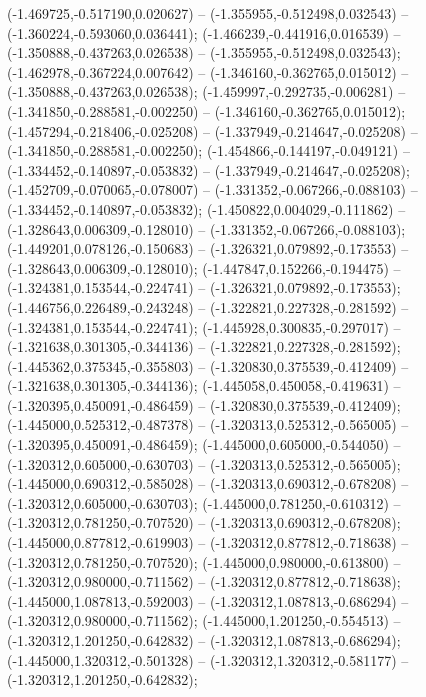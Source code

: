  (-1.469725,-0.517190,0.020627) -- (-1.355955,-0.512498,0.032543) -- (-1.360224,-0.593060,0.036441);
 (-1.466239,-0.441916,0.016539) -- (-1.350888,-0.437263,0.026538) -- (-1.355955,-0.512498,0.032543);
 (-1.462978,-0.367224,0.007642) -- (-1.346160,-0.362765,0.015012) -- (-1.350888,-0.437263,0.026538);
 (-1.459997,-0.292735,-0.006281) -- (-1.341850,-0.288581,-0.002250) -- (-1.346160,-0.362765,0.015012);
 (-1.457294,-0.218406,-0.025208) -- (-1.337949,-0.214647,-0.025208) -- (-1.341850,-0.288581,-0.002250);
 (-1.454866,-0.144197,-0.049121) -- (-1.334452,-0.140897,-0.053832) -- (-1.337949,-0.214647,-0.025208);
 (-1.452709,-0.070065,-0.078007) -- (-1.331352,-0.067266,-0.088103) -- (-1.334452,-0.140897,-0.053832);
 (-1.450822,0.004029,-0.111862) -- (-1.328643,0.006309,-0.128010) -- (-1.331352,-0.067266,-0.088103);
 (-1.449201,0.078126,-0.150683) -- (-1.326321,0.079892,-0.173553) -- (-1.328643,0.006309,-0.128010);
 (-1.447847,0.152266,-0.194475) -- (-1.324381,0.153544,-0.224741) -- (-1.326321,0.079892,-0.173553);
 (-1.446756,0.226489,-0.243248) -- (-1.322821,0.227328,-0.281592) -- (-1.324381,0.153544,-0.224741);
 (-1.445928,0.300835,-0.297017) -- (-1.321638,0.301305,-0.344136) -- (-1.322821,0.227328,-0.281592);
 (-1.445362,0.375345,-0.355803) -- (-1.320830,0.375539,-0.412409) -- (-1.321638,0.301305,-0.344136);
 (-1.445058,0.450058,-0.419631) -- (-1.320395,0.450091,-0.486459) -- (-1.320830,0.375539,-0.412409);
 (-1.445000,0.525312,-0.487378) -- (-1.320313,0.525312,-0.565005) -- (-1.320395,0.450091,-0.486459);
 (-1.445000,0.605000,-0.544050) -- (-1.320312,0.605000,-0.630703) -- (-1.320313,0.525312,-0.565005);
 (-1.445000,0.690312,-0.585028) -- (-1.320313,0.690312,-0.678208) -- (-1.320312,0.605000,-0.630703);
 (-1.445000,0.781250,-0.610312) -- (-1.320312,0.781250,-0.707520) -- (-1.320313,0.690312,-0.678208);
 (-1.445000,0.877812,-0.619903) -- (-1.320312,0.877812,-0.718638) -- (-1.320312,0.781250,-0.707520);
 (-1.445000,0.980000,-0.613800) -- (-1.320312,0.980000,-0.711562) -- (-1.320312,0.877812,-0.718638);
 (-1.445000,1.087813,-0.592003) -- (-1.320312,1.087813,-0.686294) -- (-1.320312,0.980000,-0.711562);
 (-1.445000,1.201250,-0.554513) -- (-1.320312,1.201250,-0.642832) -- (-1.320312,1.087813,-0.686294);
 (-1.445000,1.320312,-0.501328) -- (-1.320312,1.320312,-0.581177) -- (-1.320312,1.201250,-0.642832);

